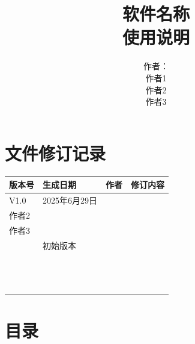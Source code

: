 \documentclass[12pt]{ctexart}
\newcommand{\SoftwareName}{软件名称}
\newcommand{\PureAuthors}{%
	作者1 \\
	作者2 \\
	作者3%
}
\newcommand{\BasicAuthor}{作者：\\\PureAuthors}
\newcommand{\RevisedAuthor}{%
	\StrSubstitute{\PureAuthors}{\\}{, }%
}
\begin{document}
	\title{\erhao\textbf{\SoftwareName}\\[0.5em] \sanhao 使用说明}
	\author{ \BasicAuthor }
	\date{}
	\maketitle

	\newpage
	\section*{文件修订记录}

	\begingroup
	\renewcommand{\arraystretch}{1.5} %
	\begin{center}
		\begin{tabular}{ | m{1.5cm}<{\centering}|m{4cm}<{\centering} | m{4.64cm}<{\centering} | m{3.5cm}<{\centering} |}
			\hline
			版本号 & 生成日期 & 作者 & 修订内容 \\ %
			\hline
			V1.0 & 2025年6月29日 & \RevisedAuthor  & 初始版本 \\ %
			\hline
			&  &  &  \\ %
			\hline
			&  &  &  \\ %
			\hline
			&  &  &  \\ %
			\hline
			&  &  &  \\ %
			\hline
			&  &  &  \\ %
			\hline
			&  &  &  \\ %
			\hline
			&  &  &  \\ %
			\hline
			&  &  &  \\ %
			\hline
			&  &  &  \\ %
			\hline
			&  &  &  \\ %
			\hline
			&  &  &  \\ %
			\hline
			&  &  &  \\ %
			\hline
			&  &  &  \\ %
			\hline
		\end{tabular}
	\end{center}
	\endgroup

	\newpage
	\section*{目录}
	\makeatletter
	\makeatother
\end{document}
